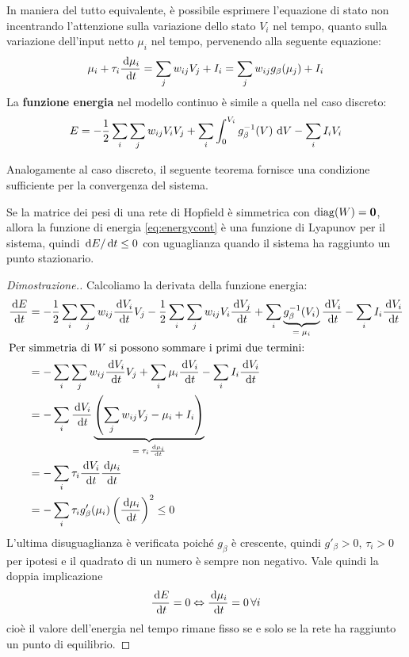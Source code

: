 In maniera del tutto equivalente, è possibile esprimere l'equazione di stato non incentrando l'attenzione sulla variazione dello stato $V_i$ nel tempo, quanto sulla variazione dell'input netto $\mu_i$ nel tempo, pervenendo alla seguente equazione:
\begin{displaymath}
	\mu_i + \tau_i \frac{\, \mathrm{d}\mu_i}{\, \mathrm{d} t} = \sum_j w_{ij} V_j + I_i = \sum_j w_{ij} g_\beta (\mu_j) + I_i \\
\end{displaymath}
La \textbf{funzione energia} nel modello continuo è simile a quella nel caso discreto:
\begin{align}
	E = - \frac{1}{2} \sum_i \sum_j w_{ij} V_i V_j + \sum_i \int_0^{V_i} g^{-1}_\beta (V) \, \, \mathrm{d} V - \sum_i I_i V_i \label{eq:energycont}
\end{align}

Analogamente al caso discreto, il seguente teorema fornisce una condizione sufficiente per la convergenza del sistema.
\begin{thm}
	Se la matrice dei pesi di una rete di Hopfield è simmetrica con $\diag(W) = \vec{0}$, allora la funzione di energia \eqref{eq:energycont} è una funzione di Lyapunov per il sistema, quindi $\, \mathrm{d} E / \, \mathrm{d} t \leq 0$ con uguaglianza quando il sistema ha raggiunto un punto stazionario.
\end{thm}

\begin{proof}[Dimostrazione.]
	Calcoliamo la derivata della funzione energia:
	\begin{align*}
		\frac{\, \mathrm{d} E}{\, \mathrm{d} t} &= - \frac{1}{2} \sum_i \sum_j w_{ij} \frac{\, \mathrm{d} V_i}{\, \mathrm{d} t} V_j - \frac{1}{2} \sum_i \sum_j w_{ij} V_i \frac{\, \mathrm{d} V_j}{\, \mathrm{d} t} + \sum_i \underbrace{g_\beta^{-1}(V_i)}_\textrm{$= \mu_i$} \frac{\, \mathrm{d} V_i}{\, \mathrm{d} t} - \sum_i I_i \frac{\, \mathrm{d} V_i}{\, \mathrm{d} t} \\
		\intertext{Per simmetria di $W$ si possono sommare i primi due termini:}
		&=  - \sum_i \sum_j w_{ij} \frac{\, \mathrm{d} V_i}{\, \mathrm{d} t} V_j + \sum_i \mu_i \frac{\, \mathrm{d} V_i}{\, \mathrm{d} t} - \sum_i I_i \frac{\, \mathrm{d} V_i}{\, \mathrm{d} t} \\
		&= - \sum_i \frac{\, \mathrm{d} V_i}{\, \mathrm{d} t} \underbrace{\left(\sum_j w_{ij} V_j - \mu_i + I_i \right)}_\textrm{$ = \tau_i \frac{\, \mathrm{d} \mu_i}{\, \mathrm{d} t}$} \\
		&= - \sum_i \tau_i \frac{\, \mathrm{d} V_i}{\, \mathrm{d} t} \frac{\, \mathrm{d} \mu_i}{\, \mathrm{d} t} \\
		&= - \sum_i \tau_i g'_\beta(\mu_i) \left(\frac{\, \mathrm{d} \mu_i}{\, \mathrm{d} t} \right)^2 \leq 0
	\end{align*}
	L'ultima disuguaglianza è verificata poiché $g_\beta$ è crescente, quindi $g'_\beta > 0$, $\tau_i > 0$ per ipotesi e il quadrato di un numero è sempre non negativo. Vale quindi la doppia implicazione
	\begin{align*}
		\frac{\, \mathrm{d} E}{\, \mathrm{d} t} = 0 \Leftrightarrow \frac{\, \mathrm{d} \mu_i}{\, \mathrm{d} t} = 0 \,\forall i
	\end{align*}
	cioè il valore dell'energia nel tempo rimane fisso se e solo se la rete ha raggiunto un punto di equilibrio.
\end{proof}

